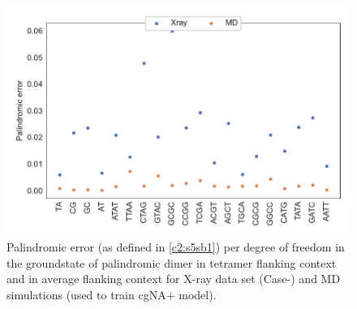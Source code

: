 \begin{figure}[H]
	\begin{center}
	\includegraphics[scale=0.8]{./Xray_images/palin_err_tt2_3S_C1_cg_unsym.pdf}
	\caption{
    Palindromic error (as defined in \cref{c2:s5sb1}) per degree of freedom in the groundstate of palindromic dimer in tetramer flanking context and in average flanking context for X-ray data set (Case-) and MD simulations (used to train cgNA$+$ model). 
	}
\label{SIfig:palin_error_X2}
\end{center}
\end{figure}


